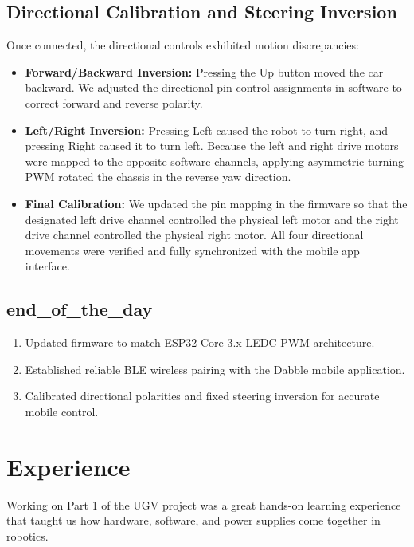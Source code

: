 \documentclass[11pt,a4paper]{article}
\begin{document}
\subsection*{Directional Calibration and Steering Inversion}
Once connected, the directional controls exhibited motion discrepancies:
\begin{itemize}
    \item \textbf{Forward/Backward Inversion:} Pressing the Up button moved the car backward. We adjusted the directional pin control assignments in software to correct forward and reverse polarity.
    \item \textbf{Left/Right Inversion:} Pressing Left caused the robot to turn right, and pressing Right caused it to turn left. Because the left and right drive motors were mapped to the opposite software channels, applying asymmetric turning PWM rotated the chassis in the reverse yaw direction.
    \item \textbf{Final Calibration:} We updated the pin mapping in the firmware so that the designated left drive channel controlled the physical left motor and the right drive channel controlled the physical right motor. All four directional movements were verified and fully synchronized with the mobile app interface.
\end{itemize}

\subsection{end\_of\_the\_day}
\begin{enumerate}
    \item Updated firmware to match ESP32 Core 3.x LEDC PWM architecture.
    \item Established reliable BLE wireless pairing with the Dabble mobile application.
    \item Calibrated directional polarities and fixed steering inversion for accurate mobile control.
\end{enumerate}

\section{Experience}
Working on Part 1 of the UGV project was a great hands-on learning experience that taught us how hardware, software, and power supplies come together in robotics.
\end{document}
